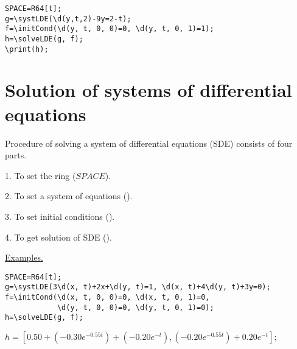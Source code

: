 \begin{verbatim}
SPACE=R64[t]; 
g=\systLDE(\d(y,t,2)-9y=2-t);
f=\initCond(\d(y, t, 0, 0)=0, \d(y, t, 0, 1)=1);
h=\solveLDE(g, f);
\print(h);
\end{verbatim}


\section{Solution of systems of differential equations} 
Procedure of solving a system of differential equations (SDE) consists of four parts.

1. To set the ring  ($SPACE$).  

2. To set a system of equations ().

3. To set initial conditions ().  

4. To get solution of SDE ().  

\underline{Examples. }
\vspace*{-2mm}

\begin{verbatim}
SPACE=R64[t];
g=\systLDE(3\d(x, t)+2x+\d(y, t)=1, \d(x, t)+4\d(y, t)+3y=0);
f=\initCond(\d(x, t, 0, 0)=0, \d(x, t, 0, 1)=0, 
            \d(y, t, 0, 0)=0, \d(y, t, 0, 1)=0);
h=\solveLDE(g, f);  
\end{verbatim}

{$h = [0. 50+(-0. 30 e^{-0. 55t})+(-0. 20 e^{-t}), (-0. 20 e^{-0. 55t})+0. 20 e^{-t}];$}

